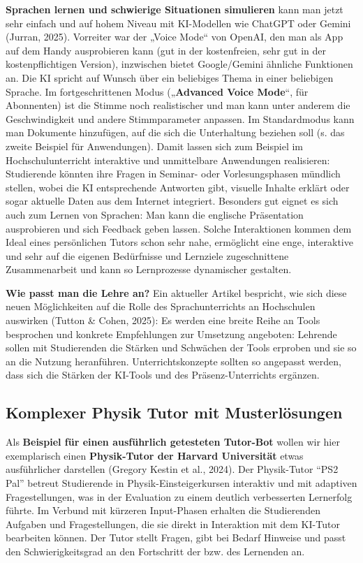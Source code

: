 \documentclass[
  ngerman,
  letterpaper,
  DIV=11]{scrreprt}
\begin{document}
\textbf{Sprachen lernen und schwierige Situationen simulieren} kann man
jetzt sehr einfach und auf hohem Niveau mit KI-Modellen wie ChatGPT oder
Gemini (Jurran, 2025). Vorreiter war der „Voice Mode`` von OpenAI, den
man als App auf dem Handy ausprobieren kann (gut in der kostenfreien,
sehr gut in der kostenpflichtigen Version), inzwischen bietet
Google/Gemini ähnliche Funktionen an. Die KI spricht auf Wunsch über ein
beliebiges Thema in einer beliebigen Sprache. Im fortgeschrittenen Modus
(„\textbf{Advanced Voice Mode}``, für Abonnenten) ist die Stimme noch
realistischer und man kann unter anderem die Geschwindigkeit und andere
Stimmparameter anpassen. Im Standardmodus kann man Dokumente hinzufügen,
auf die sich die Unterhaltung beziehen soll (s. das zweite Beispiel für
Anwendungen). Damit lassen sich zum Beispiel im Hochschulunterricht
interaktive und unmittelbare Anwendungen realisieren: Studierende
könnten ihre Fragen in Seminar- oder Vorlesungsphasen mündlich stellen,
wobei die KI entsprechende Antworten gibt, visuelle Inhalte erklärt oder
sogar aktuelle Daten aus dem Internet integriert. Besonders gut eignet
es sich auch zum Lernen von Sprachen: Man kann die englische
Präsentation ausprobieren und sich Feedback geben lassen. Solche
Interaktionen kommen dem Ideal eines persönlichen Tutors schon sehr
nahe, ermöglicht eine enge, interaktive und sehr auf die eigenen
Bedürfnisse und Lernziele zugeschnittene Zusammenarbeit und kann so
Lernprozesse dynamischer gestalten.

\textbf{Wie passt man die Lehre an?} Ein aktueller Artikel bespricht,
wie sich diese neuen Möglichkeiten auf die Rolle des Sprachunterrichts
an Hochschulen auswirken (Tutton \& Cohen, 2025): Es werden eine breite
Reihe an Tools besprochen und konkrete Empfehlungen zur Umsetzung
angeboten: Lehrende sollen mit Studierenden die Stärken und Schwächen
der Tools erproben und sie so an die Nutzung heranführen.
Unterrichtskonzepte sollten so angepasst werden, dass sich die Stärken
der KI-Tools und des Präsenz-Unterrichts ergänzen.

\subsection{Komplexer Physik Tutor mit
Musterlösungen}\label{sec-complex-tutors}

Als \textbf{Beispiel für einen ausführlich getesteten Tutor-Bot} wollen
wir hier exemplarisch einen \textbf{Physik-Tutor der Harvard
Universität} etwas ausführlicher darstellen (Gregory Kestin et al.,
2024). Der Physik-Tutor ``PS2 Pal'' betreut Studierende in
Physik-Einsteigerkursen interaktiv und mit adaptiven Fragestellungen,
was in der Evaluation zu einem deutlich verbesserten Lernerfolg führte.
Im Verbund mit kürzeren Input-Phasen erhalten die Studierenden Aufgaben
und Fragestellungen, die sie direkt in Interaktion mit dem KI-Tutor
bearbeiten können. Der Tutor stellt Fragen, gibt bei Bedarf Hinweise und
passt den Schwierigkeitsgrad an den Fortschritt der bzw. des Lernenden
an.
\end{document}
